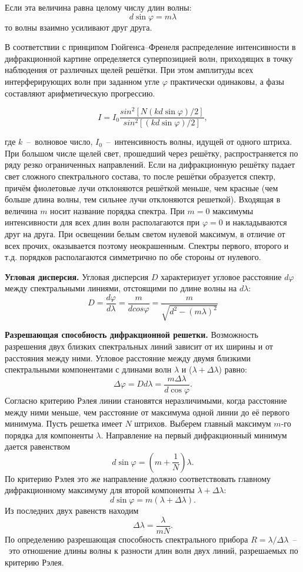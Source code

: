 \documentclass{article}
\begin{document}
Если эта величина равна целому числу длин волны:
\begin{equation}
    d \sin \varphi = m \lambda
\end{equation}
то волны взаимно усиливают друг друга.


В соответствии с принципом Гюйгенса–Френеля распределение интенсивности в дифракционной картине определяется суперпозицией волн, приходящих в точку наблюдения от различных щелей решётки. При этом амплитуды всех интерферирующих волн при заданном угле $\varphi$ практически одинаковы, а фазы составляют арифметическую прогрессию.

\[
I = I_0 \dfrac{sin^2[N(kd \sin{\varphi})/2]}{sin^2[(kd \sin{\varphi})/2]},
\]

где $k$~--~волновое число, $I_0$~--~интенсивность волны, идущей от одного штриха. При большом числе щелей свет, прошедший через решётку, распространяется по ряду резко ограниченных направлений. Если на дифракционную решётку падает свет сложного спектрального состава, то после решётки образуется спектр, причём фиолетовые лучи отклоняются решёткой меньше, чем красные (чем больше длина волны, тем сильнее лучи отклоняются решеткой). Входящая в величина $m$ носит название порядка спектра. При $m = 0$ максимумы интенсивности для всех длин волн располагаются при $\varphi = 0$ и накладываются друг на друга. При освещении белым светом нулевой максимум, в отличие от всех прочих, оказывается поэтому неокрашенным. Спектры первого, второго и т.д. порядков располагаются симметрично по обе стороны от нулевого.

\textbf{Угловая дисперсия.} Угловая дисперсия $D$ характеризует угловое расстояние $d \varphi$ между спектральными линиями, отстоящими по длине волны на $d \lambda$:
\begin{equation}
    D=\dfrac{d \varphi}{d \lambda}=\frac{m}{d cos \varphi}=\dfrac{m}{\sqrt{d^{2}-(m \lambda)^{2}}}
\end{equation}

\textbf{Разрешающая способность дифракционной решетки.} Возможность разрешения двух близких спектральных линий зависит от их ширины и от расстояния между ними. Угловое расстояние между двумя близкими спектральными компонентами с длинами волн $\lambda$ и ($\lambda + \Delta \lambda$) равно:
\[
\Delta \varphi =  D d \lambda = \frac{m \Delta \lambda}{d \cos{\varphi}}.
\]
Согласно критерию Рэлея линии становятся неразличимыми, когда расстояние между ними меньше, чем расстояние от максимума одной линии до её первого минимума. Пусть решетка имеет $N$ штрихов. Выберем главный максимум $m$-го порядка для компоненты $\lambda$. Направление на первый дифракционный минимум дается равенством 
\[ d \sin \varphi = \left( m + \dfrac{1}{N} \right) \lambda. \]
По критерию Рэлея это же направление должно соответствовать главному дифракционному максимуму для второй компоненты $\lambda + \Delta \lambda$:
\[ d \sin \varphi = m (\lambda + \Delta \lambda) .\]
Из последних двух равенств находим 
\[\Delta \lambda = \dfrac{\lambda}{mN}.\]
По определению разрешающая способность спектрального прибора $R = \lambda / \Delta \lambda$~--~это отношение длины волны к разности длин волн двух линий, разрешаемых по критерию Рэлея.
\end{document}
